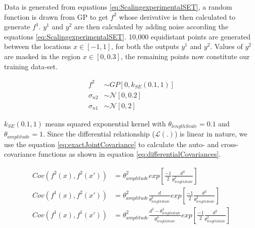 Data is generated from equations \ref{eq:ScalingexperimentalSET}, a random function is drawn from GP to get \(f^{2}\) whose derivative is then calculated to generate \(f^{1}\). \(y^{1}\) and \(y^{2}\) are then calculated by adding noise according the  equations \ref{eq:ScalingexperimentalSET}. 10,000 equidistant points are generated between the locations $x \in [-1, 1]$, for both the outputs \(y^{1}\) and \(y^{2}\). Values of \(y^{2}\) are masked in the region \(x \in [0, 0.3]\), the remaining points now constitute our training data-set. 

\begin{equation}\label{eq:ScalingexperimentalSET}
    \begin{aligned}
    f^{2} & \sim  GP[0, k_{SE}(0.1, 1)] \\
\sigma_{n2} & \sim \mathcal{N}[0, 0.2] \\
\sigma_{n1} & \sim \mathcal{N}[0, 2]
    \end{aligned}
\end{equation}

\(k_{SE}(0.1, 1)\) means squared exponential kernel with $\theta_{lengthScale} = 0.1$ and $\theta_{amplitude} = 1$. Since the differential relationship (\(\mathcal{L}(.)\)) is linear in nature, we use the equation \ref{eq:exactJointCovariance} to calculate the auto- and cross-covariance functions as shown in equation \ref{eq:differentialCovariances}.

\begin{equation}\label{eq:differentialCovariances}
    \begin{aligned}
Cov(f^2(x), f^2(x')) & = \theta_{amplitude}^{2}exp \left [\frac{-1}{2}\frac{d^{2}}{\theta_{lengthScale}^2} \right] \\    
Cov(f^1(x), f^2(x')) & = \theta_{amplitude}^{2}\frac{d}{\theta_{lengthScale}^2}exp\left [\frac{-1}{2}\frac{d^{2}}{\theta_{lengthScale}^2}\right] \\
Cov(f^1(x), f^1(x')) & = \theta_{amplitude}^{2}\frac{d^{2}-\theta_{lengthScale}^{2}}{\theta_{lengthScale}^{4}}exp\left [\frac{-1}{2}\frac{d^{2}}{\theta_{lengthScale}^{2}}\right]
    \end{aligned}
\end{equation}

